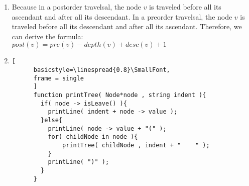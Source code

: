 \documentclass[fleqn,a4paper,12pt]{article}
\begin{document}
\begin{enumerate}
\item
  Because in a postorder travelsal, the node $v$ is traveled before all its ascendant and after all its descendant. In a preorder travelsal, the node $v$ is traveled before all its descendant and after all its ascendant. Therefore, we can derive the formula:\\
  $post(v) = pre(v) - depth(v) + desc(v) + 1$ 

\item
    \begin{lstlisting}[
      basicstyle=\linespread{0.8}\SmallFont,        
      frame = single
      ]
      function printTree( Node*node , string indent ){
        if( node -> isLeave() ){
          printLine( indent + node -> value );
        }else{
          printLine( node -> value + "(" );
          for( childNode in node ){
              printTree( childNode , indent + "    " );
          }
          printLine( ")" );
        }
      }
    \end{lstlisting}
    \end{enumerate}
\end{document}
